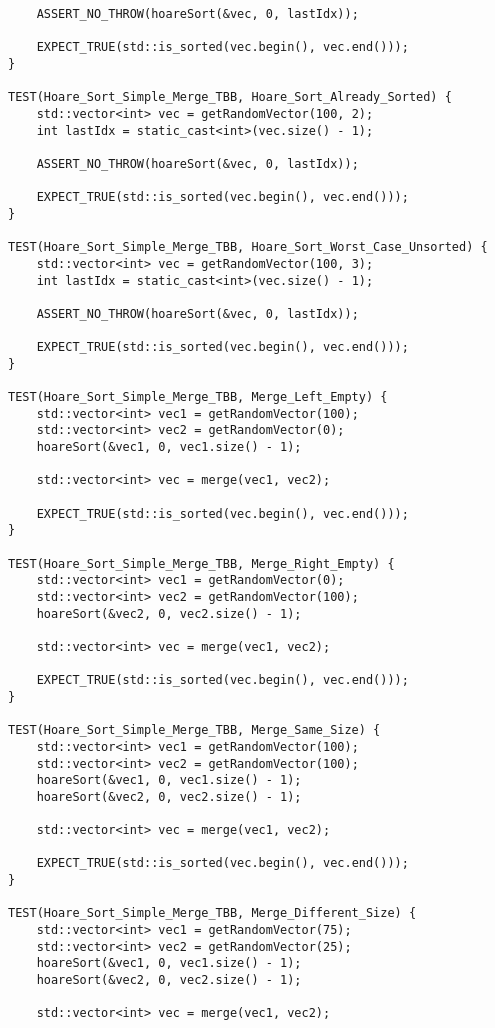 \documentclass{report}
\begin{document}
\begin{lstlisting}
    ASSERT_NO_THROW(hoareSort(&vec, 0, lastIdx));

    EXPECT_TRUE(std::is_sorted(vec.begin(), vec.end()));
}

TEST(Hoare_Sort_Simple_Merge_TBB, Hoare_Sort_Already_Sorted) {
    std::vector<int> vec = getRandomVector(100, 2);
    int lastIdx = static_cast<int>(vec.size() - 1);

    ASSERT_NO_THROW(hoareSort(&vec, 0, lastIdx));

    EXPECT_TRUE(std::is_sorted(vec.begin(), vec.end()));
}

TEST(Hoare_Sort_Simple_Merge_TBB, Hoare_Sort_Worst_Case_Unsorted) {
    std::vector<int> vec = getRandomVector(100, 3);
    int lastIdx = static_cast<int>(vec.size() - 1);

    ASSERT_NO_THROW(hoareSort(&vec, 0, lastIdx));

    EXPECT_TRUE(std::is_sorted(vec.begin(), vec.end()));
}

TEST(Hoare_Sort_Simple_Merge_TBB, Merge_Left_Empty) {
    std::vector<int> vec1 = getRandomVector(100);
    std::vector<int> vec2 = getRandomVector(0);
    hoareSort(&vec1, 0, vec1.size() - 1);

    std::vector<int> vec = merge(vec1, vec2);

    EXPECT_TRUE(std::is_sorted(vec.begin(), vec.end()));
}

TEST(Hoare_Sort_Simple_Merge_TBB, Merge_Right_Empty) {
    std::vector<int> vec1 = getRandomVector(0);
    std::vector<int> vec2 = getRandomVector(100);
    hoareSort(&vec2, 0, vec2.size() - 1);

    std::vector<int> vec = merge(vec1, vec2);

    EXPECT_TRUE(std::is_sorted(vec.begin(), vec.end()));
}

TEST(Hoare_Sort_Simple_Merge_TBB, Merge_Same_Size) {
    std::vector<int> vec1 = getRandomVector(100);
    std::vector<int> vec2 = getRandomVector(100);
    hoareSort(&vec1, 0, vec1.size() - 1);
    hoareSort(&vec2, 0, vec2.size() - 1);

    std::vector<int> vec = merge(vec1, vec2);

    EXPECT_TRUE(std::is_sorted(vec.begin(), vec.end()));
}

TEST(Hoare_Sort_Simple_Merge_TBB, Merge_Different_Size) {
    std::vector<int> vec1 = getRandomVector(75);
    std::vector<int> vec2 = getRandomVector(25);
    hoareSort(&vec1, 0, vec1.size() - 1);
    hoareSort(&vec2, 0, vec2.size() - 1);

    std::vector<int> vec = merge(vec1, vec2);


\end{lstlisting}
\end{document}
